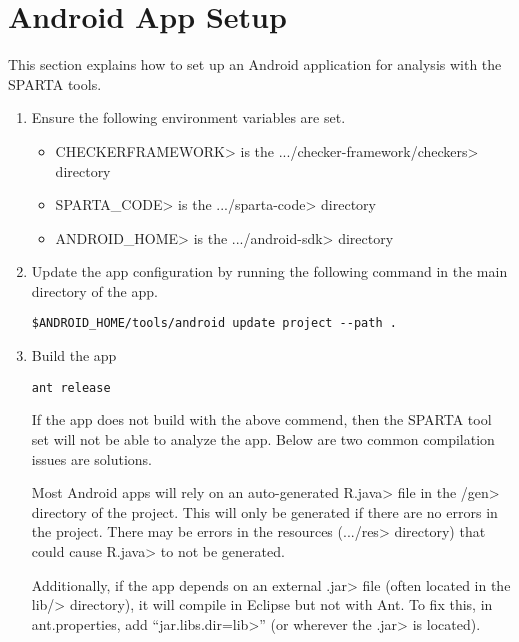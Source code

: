 \section{Android App Setup\label{sec:antsetup}}

This section explains how to set up an Android application for analysis with the SPARTA tools.
\begin{enumerate}

\item
Ensure the following environment variables are set. 

\begin{itemize}
\item
\<CHECKERFRAMEWORK> is the
\<.../checker-framework/checkers> directory

\item
\<SPARTA\_CODE> is the \<.../sparta-code> directory

\item
\<ANDROID\_HOME> is the \<.../android-sdk> directory

\end{itemize}

\item
Update the app configuration by running the following command in the main directory of the
app.
\begin{Verbatim}
$ANDROID_HOME/tools/android update project --path .
\end{Verbatim}

\item Build the app

\begin{Verbatim}
ant release
\end{Verbatim}
If the app does not build with the above commend, then the SPARTA tool set will 
not be able to analyze the app.  Below are two common compilation issues are solutions.

Most Android apps will rely on an auto-generated \<R.java> file
in the \</gen> directory of the project. This will only be generated
if there are no errors in the project. There may be errors in the
resources (\<.../res> directory) that could cause \<R.java> to not be
generated.

Additionally, if the app depends on an external \<.jar> file (often
located in the \<lib/> directory), it will compile in Eclipse but not
with Ant. To fix this, in ant.properties, add ``\<jar.libs.dir=lib>''
(or wherever the \<.jar> is located).






\end{enumerate}
